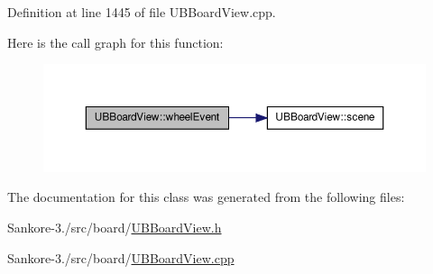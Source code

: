 Definition at line 1445 of file U\-B\-Board\-View.\-cpp.



Here is the call graph for this function\-:
\nopagebreak
\begin{figure}[H]
\begin{center}
\leavevmode
\includegraphics[width=350pt]{d1/d78/class_u_b_board_view_a127153f054ca62fc556b398b4edf45b8_cgraph}
\end{center}
\end{figure}




The documentation for this class was generated from the following files\-:\begin{DoxyCompactItemize}
\item 
Sankore-\/3./src/board/\hyperlink{_u_b_board_view_8h}{U\-B\-Board\-View.\-h}\item 
Sankore-\/3./src/board/\hyperlink{_u_b_board_view_8cpp}{U\-B\-Board\-View.\-cpp}\end{DoxyCompactItemize}
